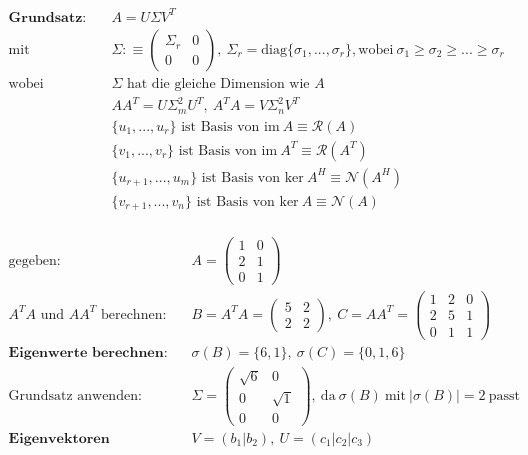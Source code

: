 \documentclass[11pt]{article}
\begin{document}
\begin{equation*}
\begin{split}
	\textbf{Grundsatz:}\quad & A = U\Sigma V^T \\
	\text{mit} \quad & \Sigma :\equiv \begin{pmatrix}
		\Sigma_r & 0 \\ 0 & 0
	\end{pmatrix},\ \Sigma_r = \text{diag}\{\sigma_1,...,\sigma_r\}, \text{wobei}\ \sigma_1 \geq \sigma_2 \geq ... \geq \sigma_r \\
	\text{wobei} \quad & \text{$\Sigma$ hat die gleiche Dimension wie $A$} \\
	& AA^T = U\Sigma^2_mU^T,\ A^TA = V\Sigma^2_nV^T \\
	& \text{$\{u_1,...,u_r\}$ ist Basis von $\text{im}\ A \equiv \mathcal{R}(A)$} \\
	& \text{$\{v_1,...,v_r\}$ ist Basis von $\text{im}\ A^T \equiv \mathcal{R}(A^T)$} \\
	& \text{$\{u_{r+1},...,u_m\}$ ist Basis von $\text{ker}\ A^H \equiv \mathcal{N}(A^H)$} \\
	& \text{$\{v_{r+1},...,v_n\}$ ist Basis von $\text{ker}\ A \equiv \mathcal{N}(A)$} \\
\end{split}
\end{equation*}

\begin{equation*}
\begin{split}
	\text{gegeben:}\quad & A = \begin{pmatrix}
		1 & 0 \\ 2 & 1 \\ 0 & 1
	\end{pmatrix} \\
	\text{$A^TA$ und $AA^T$ berechnen:}\quad & B = A^TA = \begin{pmatrix}
		5 & 2 \\ 2 & 2
	\end{pmatrix},\ C = AA^T = \begin{pmatrix}
		1 & 2 & 0 \\ 2 & 5 & 1 \\ 0 & 1 & 1
	\end{pmatrix} \\
	\textbf{Eigenwerte berechnen:} \quad & \sigma(B) = \{6, 1\},\ \sigma(C) = \{0, 1, 6\} \\
	\text{Grundsatz anwenden:} \quad & \Sigma = \begin{pmatrix}
		\sqrt{6} & 0 \\ 0 & \sqrt{1} \\ 0 & 0
	\end{pmatrix},\ \text{da}\ \sigma(B)\ \text{mit}\ |\sigma(B)| = 2\ \text{passt}\\
	\textbf{Eigenvektoren berechnen:} \quad & V = (b_1|b_2),\ U = (c_1|c_2|c_3) \\
	\text{}
\end{split}
\end{equation*}
\end{document}
